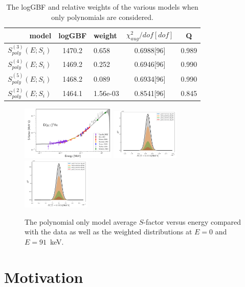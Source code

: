 \documentclass[prd,11pt,superscriptaddress,notitlepage,tightenlines,nofootinbib,floatfix]{revtex4-1}
\begin{document}
\begin{table}
\begin{ruledtabular}
\begin{tabular}{rclcc}
model& logGBF& weight& $\chi_{aug}^2/dof[dof]$& Q\\
\hline
$S_{poly}^{(3)}(E; S_i)$& 1470.2 & 0.658 & 0.6988[96] & 0.989\\
$S_{poly}^{(4)}(E; S_i)$& 1469.2 & 0.252 & 0.6946[96] & 0.990\\
$S_{poly}^{(5)}(E; S_i)$& 1468.2 & 0.089 & 0.6934[96] & 0.990\\
$S_{poly}^{(2)}(E; S_i)$& 1464.1 & 1.56e-03 & 0.8541[96] & 0.845\\
\end{tabular}
\end{ruledtabular}
\caption{\label{tab:poly}
The logGBF and relative weights of the various models when only polynomials are considered.
}
\end{table}
    
\begin{figure}
\includegraphics[width=0.4\textwidth]{figures/S_model_avg_poly}
\includegraphics[width=0.29\textwidth]{figures/S_E0.0000_hist_poly}
\includegraphics[width=0.29\textwidth]{figures/S_E0.0910_hist_poly}
\caption{\label{fig:poly}
The polynomial only model average $S$-factor versus energy compared with the data as well as the weighted distributions at $E=0$ and $E=91$~keV.}
\end{figure}
    



\section{Motivation}
\end{document}
